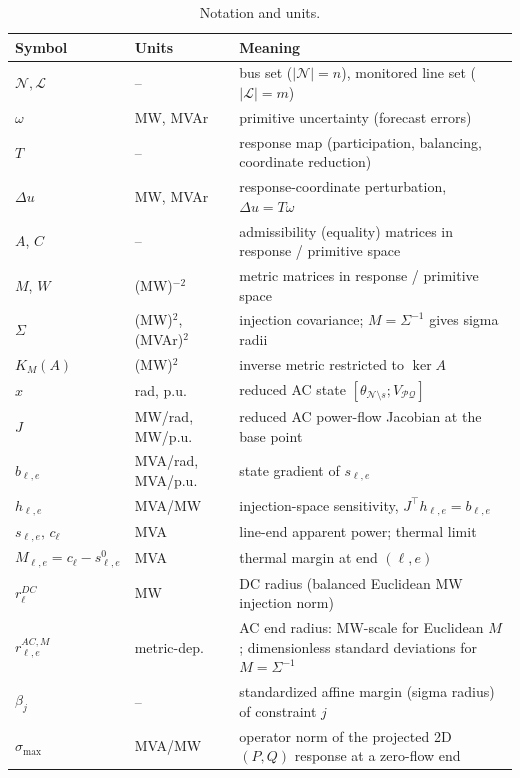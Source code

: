 \begin{table}[t]
\centering
\caption{Notation and units.\label{tab:notation}}
\scriptsize
\begin{tabularx}{\textwidth}{@{}llY@{}}
\toprule
Symbol & Units & Meaning \\
\midrule
$\mathcal{N}, \mathcal{L}$ & -- & bus set ($|\mathcal{N}|=n$), monitored line set ($|\mathcal{L}|=m$) \\
$\omega$ & MW, MVAr & primitive uncertainty (forecast errors) \\
$T$ & -- & response map (participation, balancing, coordinate reduction) \\
$\Delta u$ & MW, MVAr & response-coordinate perturbation, $\Delta u = T\omega$ \\
$A$, $C$ & -- & admissibility (equality) matrices in response / primitive space \\
$M$, $W$ & (MW)$^{-2}$ & metric matrices in response / primitive space \\
$\Sigma$ & (MW)$^2$, (MVAr)$^2$ & injection covariance; $M=\Sigma^{-1}$ gives sigma radii \\
$K_M(A)$ & (MW)$^2$ & inverse metric restricted to $\ker A$ \\
$x$ & rad, p.u. & reduced AC state $[\theta_{\mathcal{N}\setminus s}; V_{\mathcal{PQ}}]$ \\
$J$ & MW/rad, MW/p.u. & reduced AC power-flow Jacobian at the base point \\
$b_{\ell,e}$ & MVA/rad, MVA/p.u. & state gradient of $s_{\ell,e}$ \\
$h_{\ell,e}$ & MVA/MW & injection-space sensitivity, $J^\top h_{\ell,e} = b_{\ell,e}$ \\
$s_{\ell,e},\, c_\ell$ & MVA & line-end apparent power; thermal limit \\
$M_{\ell,e} = c_\ell - s^0_{\ell,e}$ & MVA & thermal margin at end $(\ell,e)$ \\
$r^{DC}_\ell$ & MW & DC radius (balanced Euclidean MW injection norm) \\
$r^{AC,M}_{\ell,e}$ & metric-dep. & AC end radius: MW-scale for Euclidean $M$; dimensionless standard deviations for $M=\Sigma^{-1}$ \\
$\beta_j$ & -- & standardized affine margin (sigma radius) of constraint $j$ \\
$\sigma_{\max}$ & MVA/MW & operator norm of the projected 2D $(P,Q)$ response at a zero-flow end \\
\bottomrule
\end{tabularx}
\end{table}
